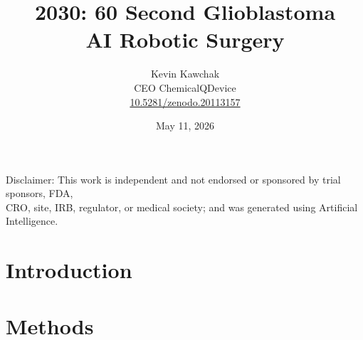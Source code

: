 \documentclass[11pt]{article}
\title{2030: 60 Second Glioblastoma\\AI Robotic Surgery}
\author{
  Kevin Kawchak\hspace{2pt}\orcidicon{0009-0007-5457-8667} \\
  CEO ChemicalQDevice\\
  \href{https://doi.org/10.5281/zenodo.20113157}{10.5281/zenodo.20113157} \\
}
\date{May 11, 2026}
\begin{document}
\maketitle

\begin{abstract}

\end{abstract}

\begin{center}
\normalsize
Disclaimer: This work is independent and not endorsed or sponsored by
trial sponsors, FDA,\\CRO, site, IRB, regulator, or medical society; and was
generated using Artificial Intelligence.
\end{center}


\vspace{-0.2cm}

\section{Introduction}
\label{sec:introduction}


\tableofcontents

\vspace{0.4cm}

\newpage
\section{Methods}
\label{sec:methods}

\newpage
 
\end{document}

